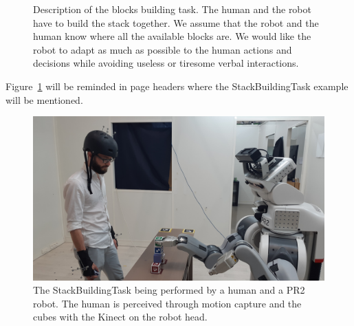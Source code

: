 \documentclass[a4paper,11pt,twoside]{StyleThese}
\begin{document}
\begin{figure}[!htb]
	\hspace*{\fill}%
	\hfill
	\hspace*{\fill}
	\caption{Description of the blocks building task. The human and the robot have to build the stack together. We assume that the robot and the human know where all the available blocks are. We would like the robot to adapt as much as possible to the human actions and decisions while avoiding useless or tiresome verbal interactions.}
	\label{chap6:fig:task_blocks}
\end{figure}

Figure~\ref{chap6:fig:task_blocks} will be reminded in page headers where the StackBuildingTask example will be mentioned.

\begin{figure}[!ht]
	\centering
	\includegraphics[width=0.7\linewidth]{figures/chapter2/building_task.jpg}
	\caption{The StackBuildingTask being performed by a human and a PR2 robot. The human is perceived through motion capture and the cubes with the Kinect on the robot head.}
	\label{chap6:fig:building_task}
\end{figure}
\end{document}
